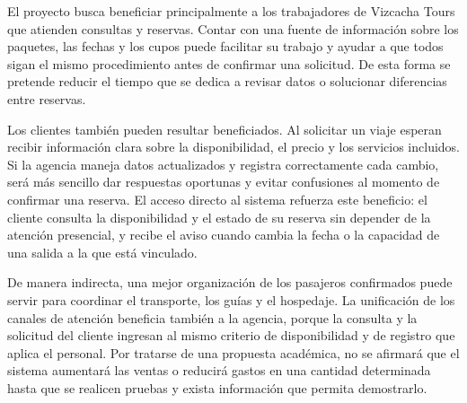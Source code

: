 \label{cap:justificacion}

El proyecto busca beneficiar principalmente a los trabajadores de Vizcacha
Tours que atienden consultas y reservas. Contar con una fuente de información
sobre los paquetes, las fechas y los cupos puede facilitar su trabajo y ayudar
a que todos sigan el mismo procedimiento antes de confirmar una solicitud. De
esta forma se pretende reducir el tiempo que se dedica a revisar datos o
solucionar diferencias entre reservas.

Los clientes también pueden resultar beneficiados. Al solicitar un viaje
esperan recibir información clara sobre la disponibilidad, el precio y los
servicios incluidos. Si la agencia maneja datos actualizados y registra
correctamente cada cambio, será más sencillo dar respuestas oportunas y
evitar confusiones al momento de confirmar una reserva. El acceso directo al
sistema refuerza este beneficio: el cliente consulta la disponibilidad y el
estado de su reserva sin depender de la atención presencial, y recibe el
aviso cuando cambia la fecha o la capacidad de una salida a la que está
vinculado.

De manera indirecta, una mejor organización de los pasajeros confirmados puede
servir para coordinar el transporte, los guías y el hospedaje. La unificación
de los canales de atención beneficia también a la agencia, porque la consulta
y la solicitud del cliente ingresan al mismo criterio de disponibilidad y de
registro que aplica el personal. Por tratarse de una propuesta académica, no
se afirmará que el sistema aumentará las ventas o reducirá gastos en una
cantidad determinada hasta que se realicen pruebas y exista información que
permita demostrarlo.
